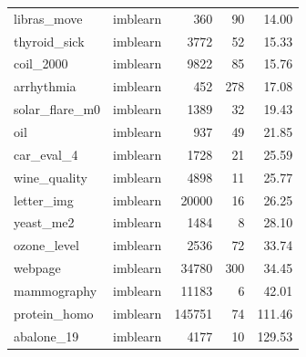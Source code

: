 \begin{longtable}{llrrr}
    libras\_move & imblearn & 360 & 90 & 14.00 \\
    thyroid\_sick & imblearn & 3772 & 52 & 15.33 \\
    coil\_2000 & imblearn & 9822 & 85 & 15.76 \\
    arrhythmia & imblearn & 452 & 278 & 17.08 \\
    solar\_flare\_m0 & imblearn & 1389 & 32 & 19.43 \\
    oil & imblearn & 937 & 49 & 21.85 \\
    car\_eval\_4 & imblearn & 1728 & 21 & 25.59 \\
    wine\_quality & imblearn & 4898 & 11 & 25.77 \\
    letter\_img & imblearn & 20000 & 16 & 26.25 \\
    yeast\_me2 & imblearn & 1484 & 8 & 28.10 \\
    ozone\_level & imblearn & 2536 & 72 & 33.74 \\
    webpage & imblearn & 34780 & 300 & 34.45 \\
    mammography & imblearn & 11183 & 6 & 42.01 \\
    protein\_homo & imblearn & 145751 & 74 & 111.46 \\
    abalone\_19 & imblearn & 4177 & 10 & 129.53 \\
\midrule
\end{longtable}